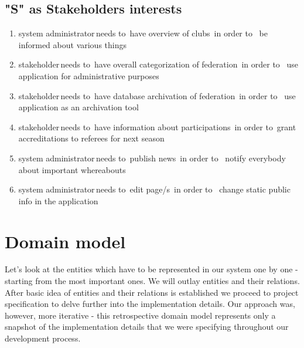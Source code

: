 \subsection*{"S" as Stakeholders interests}
\begin{enumerate}
  \item \lbrack system administrator\rbrack \,needs to\, \lbrack have overview of clubs\rbrack \, in order to \, \lbrack be informed about various things\rbrack
  \item \lbrack stakeholder\rbrack \,needs to\, \lbrack have overall categorization of federation\rbrack \, in order to \, \lbrack use application for administrative purposes\rbrack
  \item \lbrack stakeholder\rbrack \,needs to\, \lbrack have database archivation of federation\rbrack \, in order to \, \lbrack use application as an archivation tool\rbrack
  \item \lbrack stakeholder\rbrack \,needs to\, \lbrack have information about participations\rbrack \, in order to\, \lbrack grant accreditations to referees for next season\rbrack
  \item \lbrack system administrator\rbrack \,needs to\, \lbrack publish news\rbrack \, in order to \, \lbrack notify everybody about important whereabouts\rbrack
  \item \lbrack system administrator\rbrack \,needs to\, \lbrack edit page/s\rbrack \, in order to \, \lbrack change static public info in the application\rbrack
\end{enumerate}
\section{Domain model}
Let's look at the entities which have to be represented in our system one by one - starting from the most important ones. We will outlay entities and their relations. After basic idea of entities and their relations is established we proceed to project specification to delve further into the implementation details. Our approach was, however, more iterative - this retrospective domain model represents only a snapshot of the implementation details that we were specifying throughout our development process.
\par
